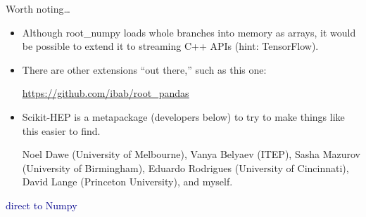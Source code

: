 \documentclass{beamer}
\begin{document}
\begin{frame}{Worth noting\ldots}
\vspace{0.25 cm}
\begin{itemize}\setlength{\itemsep}{0.5 cm}
\item Although root\_numpy loads whole branches into memory as arrays, it would be possible to extend it to streaming C++ APIs (hint: TensorFlow).

\item There are other extensions ``out there,'' such as this one:
\begin{center}
\textcolor{blue}{\underline{\url{https://github.com/ibab/root_pandas}}}
\end{center}

\item Scikit-HEP is a metapackage (developers below) to try to make things like this easier to find.

\footnotesize
\vspace{0.25 cm}
Noel Dawe (University of Melbourne), Vanya Belyaev (ITEP), Sasha Mazurov (University of Birmingham), Eduardo Rodrigues (University of Cincinnati), David Lange (Princeton University), and myself.
\end{itemize}
\end{frame}

\begin{frame}{}
\begin{center}
\LARGE \textcolor{darkblue}{direct to Numpy}
\end{center}
\end{frame}
\end{document}

